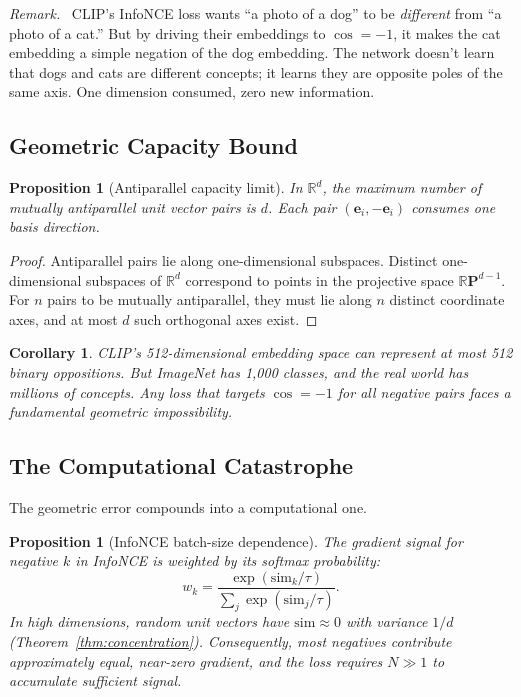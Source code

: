 \documentclass[11pt,a4paper]{article}
\newtheorem{proposition}[theorem]{Proposition}
\newtheorem{corollary}[theorem]{Corollary}
\theoremstyle{remark}
\newenvironment{critique}{\par\medskip\noindent\textit{Remark.}\ }{\par\medskip}
\begin{document}
\begin{critique}
CLIP's InfoNCE loss wants ``a photo of a dog'' to be \emph{different} from ``a photo of a cat.''
But by driving their embeddings to $\cos = -1$, it makes the cat embedding a simple negation of the dog embedding.
The network doesn't learn that dogs and cats are different concepts; it learns they are opposite poles of the same axis.
One dimension consumed, zero new information.
\end{critique}

\subsection{Geometric Capacity Bound}

\begin{proposition}[Antiparallel capacity limit]
\label{prop:capacity}
In $\mathbb{R}^d$, the maximum number of mutually antiparallel unit vector pairs is $d$.
Each pair $(\mathbf{e}_i, -\mathbf{e}_i)$ consumes one basis direction.
\end{proposition}

\begin{proof}
Antiparallel pairs lie along one-dimensional subspaces.
Distinct one-dimensional subspaces of $\mathbb{R}^d$ correspond to points in the projective space $\mathbb{R}\mathbf{P}^{d-1}$.
For $n$ pairs to be mutually antiparallel, they must lie along $n$ distinct coordinate axes, and at most $d$ such orthogonal axes exist.
\end{proof}

\begin{corollary}
CLIP's 512-dimensional embedding space can represent at most 512 binary oppositions.
But ImageNet has 1,000 classes, and the real world has millions of concepts.
Any loss that targets $\cos = -1$ for all negative pairs faces a fundamental geometric impossibility.
\end{corollary}

\subsection{The Computational Catastrophe}

The geometric error compounds into a computational one.

\begin{proposition}[InfoNCE batch-size dependence]
\label{prop:batchsize}
The gradient signal for negative $k$ in InfoNCE is weighted by its softmax probability:
\begin{equation}
  w_k = \frac{\exp(\mathrm{sim}_k / \tau)}{\sum_{j} \exp(\mathrm{sim}_j / \tau)}.
  \label{eq:softmax-weight}
\end{equation}
In high dimensions, random unit vectors have $\mathrm{sim} \approx 0$ with variance $1/d$ (Theorem~\ref{thm:concentration}).
Consequently, most negatives contribute approximately equal, near-zero gradient, and the loss requires $N \gg 1$ to accumulate sufficient signal.
\end{proposition}
\end{document}
